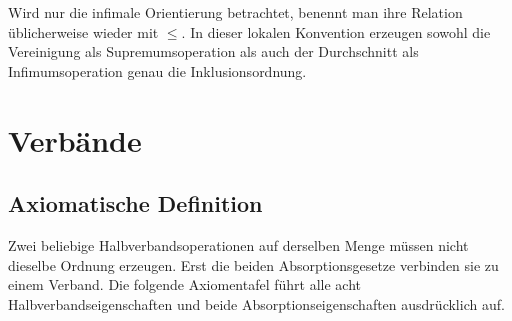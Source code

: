 \documentclass[main.tex]{subfiles}
\begin{document}
Wird nur die infimale Orientierung betrachtet, benennt man ihre Relation
üblicherweise wieder mit \(\leq\). In dieser lokalen Konvention erzeugen
sowohl die Vereinigung als Supremumsoperation als auch der Durchschnitt als
Infimumsoperation genau die Inklusionsordnung.

\chapter{Verbände}

\section{Axiomatische Definition}

Zwei beliebige Halbverbandsoperationen auf derselben Menge müssen nicht
dieselbe Ordnung erzeugen. Erst die beiden Absorptionsgesetze verbinden sie zu
einem Verband. Die folgende Axiomentafel führt alle acht Halbverbandseigenschaften
und beide Absorptionseigenschaften ausdrücklich auf.

\par\smallskip

\end{document}

